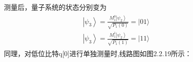 \documentclass[a4paper,11pt,english]{sphinxmanual}
\begin{document}
\sphinxAtStartPar
  测量后，量子系统的状态分别变为
\begin{equation*}
\begin{split}\begin{aligned} &\left|\psi_{3}\right\rangle=\frac{M_{1}^{0}\left|\psi_{2}\right\rangle}{\sqrt{P_{1}(0)}}=|01\rangle \\ &\left|\psi_{3}\right\rangle=\frac{M_{1}^{1}\left|\psi_{2}\right\rangle}{\sqrt{P_{1}(1)}}=|11\rangle \end{aligned}\end{split}
\end{equation*}
\sphinxAtStartPar
  同理，对低位比特q{[}0{]}进行单独测量时,线路图如图2.2.19所示：

\end{document}
